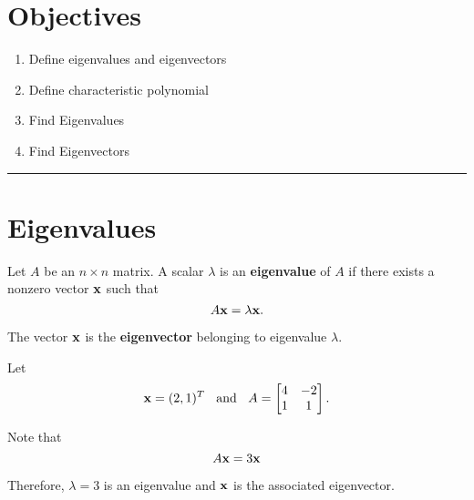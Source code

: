 %


\section*{Objectives}
\begin{enumerate}
	\item Define eigenvalues and eigenvectors
	\item Define characteristic polynomial
	\item Find Eigenvalues
	\item Find Eigenvectors
    	
\end{enumerate}






\rule[0.01in]{\textwidth}{0.0025in}


\section{Eigenvalues}

\begin{definition}
	Let $A$ be an $n \times n$ matrix.  A scalar $\lambda$ is an \textbf{eigenvalue} of $A$ if there exists a  nonzero vector ${\bf x}$ such that $$A{\bf x} = \lambda {\bf x}.$$
	
	  The vector ${\bf x}$ is the \textbf{eigenvector} belonging to eigenvalue $\lambda$.
\end{definition}
 
 
 \begin{example}
 	Let 
	\[ {\bf x} = (2, 1)^T  \; \; \text{   and  }  \;\; A =  \begin{bmatrix} 4 & -2 \\ 1  & 1 \end{bmatrix}. \]
	
	Note that \[ A {\bf x} = 3 {\bf x} \]
	
	Therefore, $\lambda = 3$ is an eigenvalue and ${\bf x}$ is the associated eigenvector.
 \end{example}



